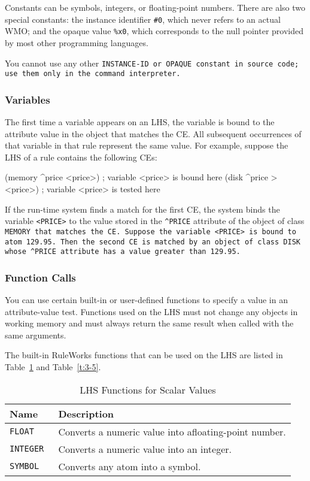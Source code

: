 Constants can be symbols, integers, or floating-point numbers. There
are also two special constants: the instance identifier \verb|#0|,
which never refers to an actual WMO; and the opaque value \verb|%x0|,
which corresponds to the
null pointer provided by most other programming languages.

You cannot use any other \tt{INSTANCE-ID} or \tt{OPAQUE} constant in
source code; use them only in the command interpreter.

\subsubsection{Variables}

The first time a variable appears on an LHS, the variable is bound to
the attribute value in the object that matches the CE. All subsequent
occurrences of that variable in that rule represent the same
value. For example, suppose the LHS of a rule contains the following
CEs:
\begin{qv}
(memory ^price <price>) ; variable <price> is bound here
(disk ^price > <price>) ; variable <price> is tested here
\end{qv}

If the run-time system finds a match for the first CE, the system
binds the variable \verb|<PRICE>| to the value stored in the
\verb|^PRICE| attribute of the object of class \tt{MEMORY} that
matches the CE. Suppose the variable \verb|<PRICE>| is bound to atom
129.95. Then the second CE is matched by an object of class \tt{DISK}
whose \verb|^PRICE| attribute has a value greater than 129.95.

\subsubsection{Function Calls}

You can use certain built-in or user-defined functions to specify a
value in an attribute-value test. Functions used on the LHS must not
change any objects in working memory and must always return the same
result when called with the same arguments.

The built-in RuleWorks functions that can be used on the LHS are
listed in Table~\ref{t:3-4} and Table~\ref{t:3-5}.

\begin{table}[h]
  \centering
  \begin{tabular}{ll}
    \toprule
    Name & Description \\
    \midrule
    \tt{FLOAT} &  Converts a numeric value into afloating-point number. \\
    \tt{INTEGER} &  Converts a numeric value into an integer. \\
    \tt{SYMBOL} & Converts any atom into a symbol. \\
    \bottomrule
  \end{tabular}
  \caption{LHS Functions for Scalar Values}
  \label{t:3-4}
\end{table}

